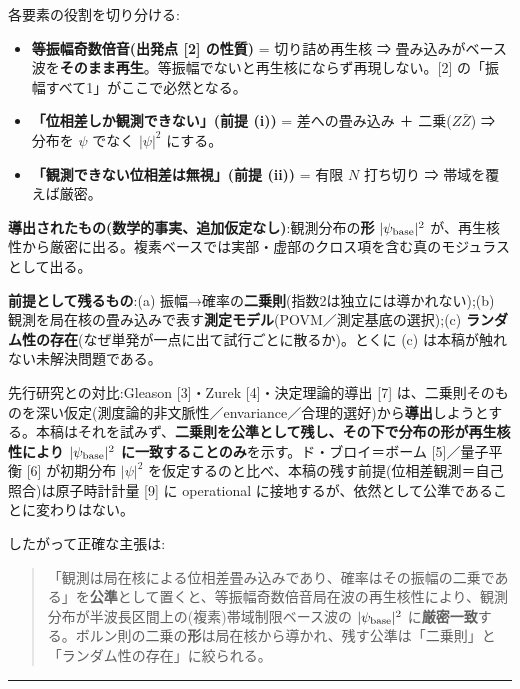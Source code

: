 \documentclass[
]{ltjsarticle}
\providecommand{\tightlist}{%
  \setlength{\itemsep}{0pt}\setlength{\parskip}{0pt}}
\begin{document}
各要素の役割を切り分ける:

\begin{itemize}
\tightlist
\item
  \textbf{等振幅奇数倍音(出発点 {[}2{]} の性質)} = 切り詰め再生核 ⇒
  畳み込みがベース波を\textbf{そのまま再生}。等振幅でないと再生核にならず再現しない。{[}2{]}
  の「振幅すべて1」がここで必然となる。
\item
  \textbf{「位相差しか観測できない」(前提 (i))} = 差への畳み込み ＋
  二乗(\(Z\bar Z\)) ⇒ 分布を \(\psi\) でなく \(|\psi|^2\) にする。
\item
  \textbf{「観測できない位相差は無視」(前提 (ii))} = 有限 \(N\) 打ち切り
  ⇒ 帯域を覆えば厳密。
\end{itemize}

\textbf{導出されたもの(数学的事実、追加仮定なし)}:観測分布の\textbf{形}
\(|\psi_{\rm base}|^2\)
が、再生核性から厳密に出る。複素ベースでは実部・虚部のクロス項を含む真のモジュラスとして出る。

\textbf{前提として残るもの}:(a)
振幅→確率の\textbf{二乗則}(指数2は独立には導かれない);(b)
観測を局在核の畳み込みで表す\textbf{測定モデル}(POVM／測定基底の選択);(c)
\textbf{ランダム性の存在}(なぜ単発が一点に出て試行ごとに散るか)。とくに
(c) は本稿が触れない未解決問題である。

先行研究との対比:Gleason {[}3{]}・Zurek {[}4{]}・決定理論的導出 {[}7{]}
は、二乗則そのものを深い仮定(測度論的非文脈性／envariance／合理的選好)から\textbf{導出}しようとする。本稿はそれを試みず、\textbf{二乗則を公準として残し、その下で分布の形が再生核性により
\(|\psi_{\rm base}|^2\) に一致することのみ}を示す。ド・ブロイ＝ボーム
{[}5{]}／量子平衡 {[}6{]} が初期分布 \(|\psi|^2\)
を仮定するのと比べ、本稿の残す前提(位相差観測＝自己照合)は原子時計計量
{[}9{]} に operational
に接地するが、依然として公準であることに変わりはない。

したがって正確な主張は:

\begin{quote}
「観測は局在核による位相差畳み込みであり、確率はその振幅の二乗である」を\textbf{公準}として置くと、等振幅奇数倍音局在波の再生核性により、観測分布が半波長区間上の(複素)帯域制限ベース波の
\(|\psi_{\rm base}|^2\)
に\textbf{厳密一致}する。ボルン則の二乗の\textbf{形}は局在核から導かれ、残す公準は「二乗則」と「ランダム性の存在」に絞られる。
\end{quote}

\begin{center}\rule{0.5\linewidth}{0.5pt}\end{center}
\end{document}
